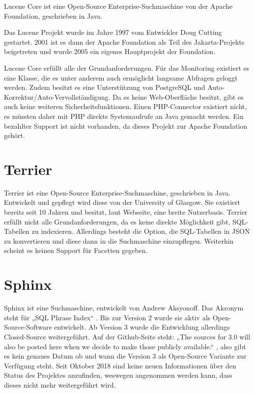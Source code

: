 Lucene Core ist eine Open-Source Enterprise-Suchmaschine von der Apache Foundation, geschrieben in Java.

Das Lucene Projekt wurde im Jahre 1997 vom Entwickler Doug Cutting gestartet. 2001 ist es dann der Apache Foundation als Teil des Jakarta-Projekts beigetreten und wurde 2005 ein eigenes Hauptprojekt der Foundation. \cite{Wikipedia.2019c}

Lucene Core erfüllt alle der Grundanforderungen. Für das Monitoring existiert es eine Klasse, die es unter anderem auch ermöglicht langsame Abfragen geloggt werden. Zudem besitzt es eine Unterstützung von PostgreSQL und Auto-Korrektur/Auto-Vervollständigung. Da es keine Web-Oberfläche besitzt, gibt es auch keine weiteren Sicherheitsfunktionen. Einen PHP-Connector existiert nicht, es müssten daher mit PHP direkte Systemaufrufe an Java gemacht werden. Ein bezahlter Support ist nicht vorhanden, da dieses Projekt zur Apache Foundation gehört. \cite{TheApacheSoftwareFoundation.2019b}

\section{Terrier}
\label{terrier}

Terrier ist eine Open-Source Enterprise-Suchmaschine, geschrieben in Java. Entwickelt und gepflegt wird diese von der University of Glasgow. Sie existiert bereits seit 10 Jahren und besitzt, laut Webseite, eine breite Nutzerbasis. 
Terrier erfüllt nicht alle Grundanforderungen, da es keine direkte Möglichkeit gibt, SQL-Tabellen zu indexieren. Allerdings besteht die Option, die SQL-Tabellen in JSON zu konvertieren und diese dann in die Suchmaschine einzupflegen. Weiterhin scheint es keinen Support für Facetten gegeben.
\cite{McCreadie.2019}

\section{Sphinx}
\label{sphinx}

Sphinx ist eine Suchmaschine, entwickelt von Andrew Aksyonoff. Das Akronym steht für „SQL Phrase Index“ \cite{SphinxTechnologiesInc.b}. Bis zur Version 2 wurde sie aktiv als Open-Source-Software entwickelt. Ab Version 3 wurde die Entwicklung allerdings Closed-Source weitergeführt. Auf der Github-Seite steht: „The sources for 3.0 will also be posted here when we decide to make those publicly available.“ \cite{sphinxserach.2019}, also gibt es kein genaues Datum ob und wann die Version 3 als Open-Source Variante zur Verfügung steht. Seit Oktober 2018 sind keine neuen Informationen über den Status des Projektes anzufinden, weswegen angenommen werden kann, dass dieses nicht mehr weitergeführt wird.


